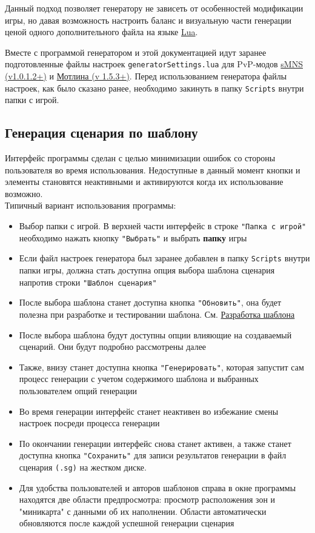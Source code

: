 Данный подход позволяет генератору не зависеть от особенностей модификации игры, но давая возможность настроить баланс и визуальную части генерации ценой одного дополнительного файла на языке \href{https://www.lua.org/}{Lua}.

Вместе с программой генератором и этой документацией идут заранее подготовленные файлы настроек \texttt{generatorSettings.lua} для PvP-модов \href{https://norvezskayasemga.pro/}{sMNS (v1.0.1.2+)} и \href{https://drive.google.com/drive/folders/1RKBPSrk6SC4viXzhdPFkUHgwEqOl3WeT}{Мотлина (v 1.5.3+)}. Перед использованием генератора файлы настроек, как было сказано ранее, необходимо закинуть в папку \texttt{Scripts} внутри папки с игрой.

\newpage
\subsection{Генерация сценария по шаблону}
Интерфейс программы сделан с целью минимизации ошибок со стороны пользователя во время использования. Недоступные в данный момент кнопки и элементы становятся неактивными и активируются когда их использование возможно.\\
Типичный вариант использования программы:
\begin{itemize}
\item Выбор папки с игрой. В верхней части интерфейс в строке \texttt{"Папка с игрой"} необходимо нажать кнопку \texttt{"Выбрать"} и выбрать \textbf{папку} игры
\item Если файл настроек генератора был заранее добавлен в папку \texttt{Scripts} внутри папки игры, должна стать доступна опция выбора шаблона сценария напротив строки \texttt{"Шаблон сценария"}
\item После выбора шаблона станет доступна кнопка \texttt{"Обновить"}, она будет полезна при разработке и тестировании шаблона. См. \hyperref[templateDevelopment]{Разработка шаблона} 
\item После выбора шаблона будут доступны опции влияющие на создаваемый сценарий. Они будут подробно рассмотрены далее
\item Также, внизу станет доступна кнопка \texttt{"Генерировать"}, которая запустит сам процесс генерации с учетом содержимого шаблона и выбранных пользователем опций генерации
\item Во время генерации интерфейс станет неактивен во избежание смены настроек посреди процесса генерации
\item По окончании генерации интерфейс снова станет активен, а также станет доступна кнопка \texttt{"Сохранить"} для записи результатов генерации в файл сценария \texttt{(.sg)} на жестком диске.
\item Для удобства пользователей и авторов шаблонов справа в окне программы находятся две области предпросмотра: просмотр расположения зон и "миникарта" с данными об их наполнении. Области автоматически обновляются после каждой успешной генерации сценария
\end{itemize}

